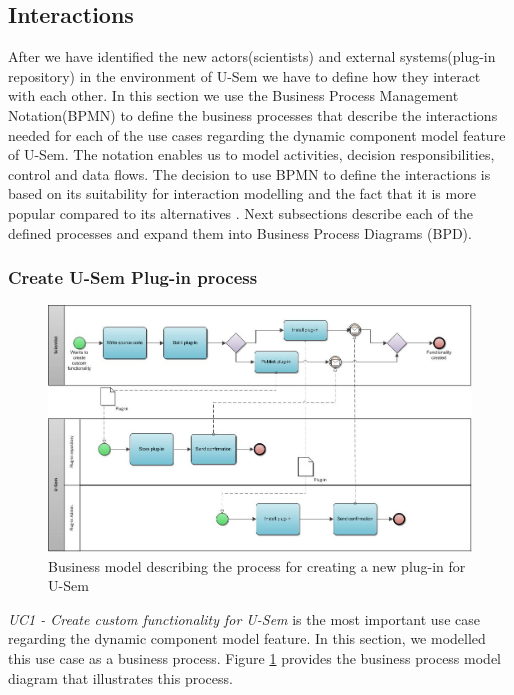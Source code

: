 \subsection{Interactions}

After we have identified the new actors(scientists) and external systems(plug-in repository) in the environment of U-Sem we have to define how they interact with each other. In this section we use the Business Process Management Notation(BPMN) \cite{wohed2006suitability} to define the business processes that describe the interactions needed for each of the use cases regarding the dynamic component model feature of U-Sem. The notation enables us to model activities, decision responsibilities, control and data flows. The decision to use BPMN to define the interactions is based on its suitability for interaction modelling and the fact that it is more popular compared to its alternatives \cite{decker2008interaction}. Next subsections describe each of the defined processes and expand them into Business Process Diagrams (BPD).

\subsubsection{Create U-Sem Plug-in process}

\begin{figure}[h!]
  \centering
  	\includegraphics[scale=0.7,angle=270]{plug-in/business_processes/CreatePlugInBusinessModel.jpg}
  \caption{Business model describing the process for creating a new plug-in for U-Sem}
  \label{fig_install_bpm}
\end{figure}

\textit{UC1 - Create custom functionality for U-Sem} is the most important use case regarding the dynamic component model feature. In this section, we modelled this use case as a business process. Figure \ref{fig_install_bpm} provides the business process model diagram that illustrates this process. 

